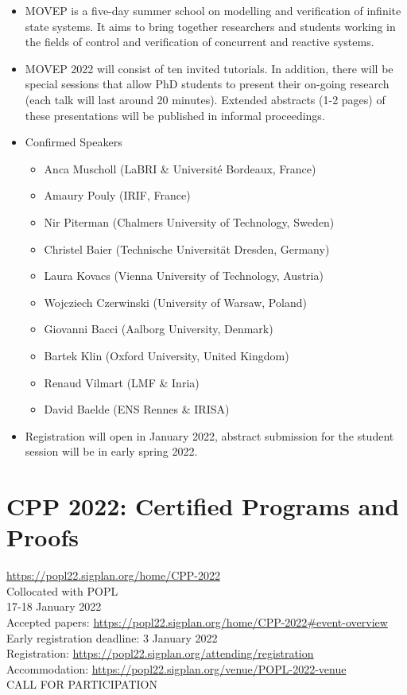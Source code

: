 \documentclass[prodmode,acmtecs]{acmsmall} %
\begin{document}
\begin{itemize}\item  MOVEP is a five-day summer school on modelling and verification of infinite state systems. It aims to bring together researchers and students working in the fields of control and verification of concurrent and reactive systems. 
 
\item  MOVEP 2022 will consist of ten invited tutorials. In addition, there will be special sessions that allow PhD students to present their on-going research (each talk will last around 20 minutes). Extended abstracts (1-2 pages) of these presentations will be published in informal proceedings. 
 
\item  Confirmed Speakers 
 
\begin{itemize}\item  Anca Muscholl (LaBRI \& Université Bordeaux, France)
\item  Amaury Pouly (IRIF, France)
\item  Nir Piterman (Chalmers University of Technology, Sweden)
\item  Christel Baier (Technische Universität Dresden, Germany)
\item  Laura Kovacs (Vienna University of Technology, Austria)
\item  Wojcziech Czerwinski (University of Warsaw, Poland)
\item  Giovanni Bacci (Aalborg University, Denmark)
\item  Bartek Klin (Oxford University, United Kingdom) 
\item  Renaud Vilmart (LMF \& Inria)
\item  David Baelde (ENS Rennes \& IRISA)  
\end{itemize} 
\item  Registration will open in January 2022, abstract submission for the student session will be in early spring 2022. 
 
\end{itemize}\section{CPP 2022: Certified Programs and Proofs }\label{CPP2022}  \href{https://popl22.sigplan.org/home/CPP-2022}{https://popl22.sigplan.org/home/CPP-2022}\\ 
  Collocated with POPL \\ 
  17-18 January 2022\\ 
  Accepted papers: \href{https://popl22.sigplan.org/home/CPP-2022#event-overview}{https://popl22.sigplan.org/home/CPP-2022\#event-overview}\\ 
  Early registration deadline: 3 January 2022\\ 
  Registration: \href{https://popl22.sigplan.org/attending/registration}{https://popl22.sigplan.org/attending/registration}\\ 
  Accommodation: \href{https://popl22.sigplan.org/venue/POPL-2022-venue}{https://popl22.sigplan.org/venue/POPL-2022-venue}\\ 
CALL FOR PARTICIPATION 
\end{document}
